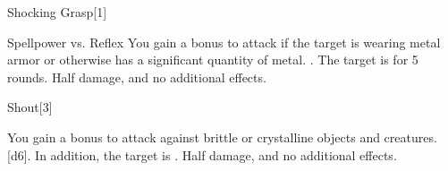 \begin{spellsection}{Shocking Grasp}[1]
    \begin{spellheader}
    \end{spellheader}
    \begin{spellcontent}
        \begin{spelltargetinginfo}
        \end{spelltargetinginfo}
        \begin{spelleffects}
            \begin{spellattack}{Spellpower vs. Reflex}
                \spellspecial You gain a  bonus to attack if the target is wearing metal armor or otherwise has a significant quantity of metal.
                \spellsuccess {}.
                \spellcritical The target is \staggered for 5 rounds.
                \spellfailure Half damage, and no additional effects.
            \end{spellattack}
        \end{spelleffects}
    \end{spellcontent}
    \begin{spellfooter}
        \miscastexplode
    \end{spellfooter}
\end{spellsection}

\begin{spellsection}{Shout}[3]
    \begin{spellheader}
    \end{spellheader}
    \begin{spellcontent}
        \begin{spelltargetinginfo}
        \end{spelltargetinginfo}
        \begin{spelleffects}
            \spellspecial You gain a  bonus to attack against brittle or crystalline objects and creatures.
            \spellsuccess {}[d6]. In addition, the target is \deafened.
            \spellfailure Half damage, and no additional effects.
        \end{spelleffects}
    \end{spellcontent}
    \begin{spellfooter}
        \miscastexplode
    \end{spellfooter}
\end{spellsection}

